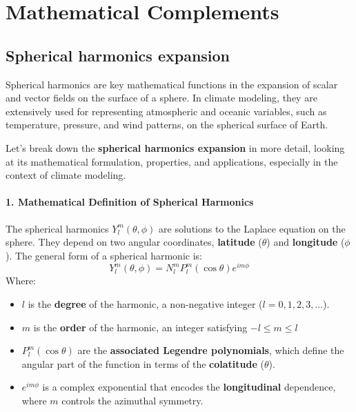 

\appendix
\chapter{Mathematical Complements }\label{ch:appendixA}

\section{Spherical harmonics expansion}

Spherical harmonics are key mathematical functions in the expansion of scalar and vector fields on the surface of a sphere. In climate modeling, they are extensively used for representing atmospheric and oceanic variables, such as temperature, pressure, and wind patterns, on the spherical surface of Earth.

Let's break down the \textbf{spherical harmonics expansion} in more detail, looking at its mathematical formulation, properties, and applications, especially in the context of climate modeling.

\subsubsection{1. \textbf{Mathematical Definition of Spherical Harmonics}}

The spherical harmonics $Y_l^m(\theta, \phi)$ are solutions to the Laplace equation on the sphere. They depend on two angular coordinates, \textbf{latitude} ($\theta$) and \textbf{longitude} ($\phi$).
The general form of a spherical harmonic is:
$$Y_l^m(\theta,\phi)=N_l^mP_l^m(\cos\theta)e^{im\phi}$$
Where:
\begin{itemize}
	\item $l$ is the \textbf{degree} of the harmonic, a non-negative integer ($l=0,1,2,3,…$).
	\item  $m$ is the \textbf{order} of the harmonic, an integer satisfying $-l\leq m\leq l$
	\item $P_l^m(\cos\theta)$ are the \textbf{associated Legendre polynomials}, which define the angular part of the function in terms of the \textbf{colatitude} ($\theta$).
	\item $e^{im\phi}$ is a complex exponential that encodes the \textbf{longitudinal} dependence, where $m$ controls the azimuthal symmetry.
\end{itemize}

